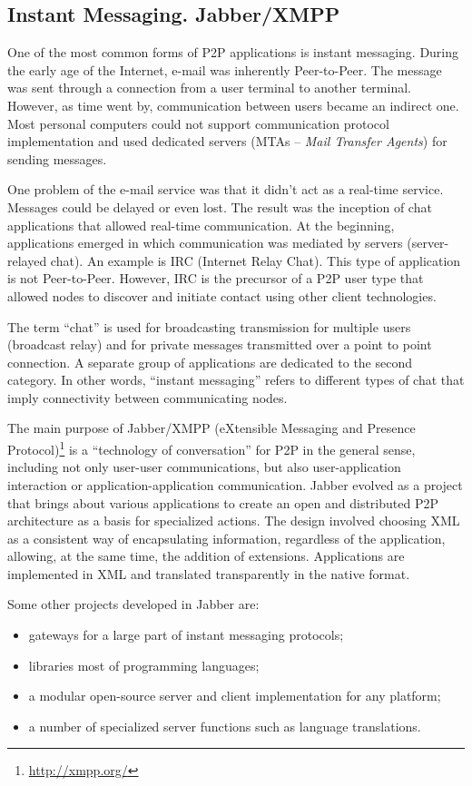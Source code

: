\subsection{Instant Messaging. Jabber/XMPP}

One of the most common forms of P2P applications is instant messaging. During
the early age of the Internet, e-mail was inherently Peer-to-Peer. The message
was sent through a connection from a user terminal to another terminal.
However, as time went by, communication between users became an indirect one. Most
personal computers could not support communication protocol implementation and used dedicated
servers (MTAs -- \textit{Mail Transfer Agents}) for sending messages.

One problem of the e-mail service was that it didn't act as a real-time service.
Messages could be delayed or even lost. The result was the inception of
chat applications that allowed real-time communication. At the beginning,
applications emerged in which communication was mediated by servers
(server-relayed chat). An example is IRC (Internet Relay Chat). This type of
application is not Peer-to-Peer. However, IRC is the precursor of a P2P user type
that allowed nodes to discover and initiate contact using other client
technologies.

The term ``chat'' is used for broadcasting transmission for
multiple users (broadcast relay) and for private messages transmitted over a
point to point connection. A separate group of applications are dedicated to
the second category. In other words, ``instant messaging'' refers to different
types of chat that imply connectivity between communicating nodes.

The main purpose of Jabber/XMPP (eXtensible Messaging and Presence
Protocol)\footnote{\url{http://xmpp.org/}}
is a ``technology of conversation'' for P2P in the general sense, including
not only user-user communications, but also user-application interaction or
application-application communication. Jabber evolved as a project that brings about various
applications to create an open and distributed P2P architecture as a basis for
specialized actions. The design involved choosing XML as a consistent way of
encapsulating information, regardless of the application, allowing, at the
same time, the
addition of extensions. Applications are implemented in XML and translated
transparently in the native format.

Some other projects developed in Jabber are:
\begin{itemize}
  \item gateways for a large part of instant messaging protocols;
  \item libraries most of programming languages;
  \item a modular open-source server and client implementation for any platform;
  \item a number of specialized server functions such as language translations.
\end{itemize}

